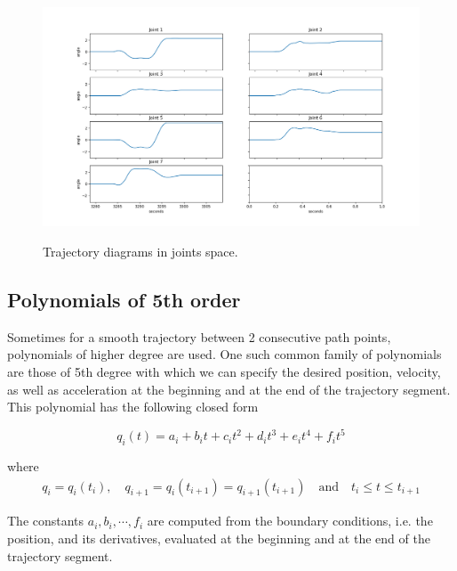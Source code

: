 \begin{center}
\begin{figure}[H]
\centering
\includegraphics[width=\textwidth]{images/trajectory1-test1.png}\\
\caption{Trajectory diagrams in joints space.}
\end{figure}
\end{center}


\subsection{Polynomials of 5th order}

Sometimes for a smooth trajectory between 2 consecutive path points, polynomials of higher degree are used. One such common family of polynomials are those of 5th degree with which we can specify the desired 
position, velocity, as well as acceleration at the beginning and at the end of the trajectory segment. This polynomial has the following closed form

\begin{equation}
q_i(t) = a_i + b_it + c_it^2 + d_it^3 + e_it^4 + f_it^5
\end{equation}

where
\begin{equation}
\begin{gathered}
q_i = q_i(t_i), \quad q_{i+1} = q_i(t_{i+1}) = q_{i+1}(t_{i+1}) \quad \textrm{and} \quad t_i \leq t \leq t_{i+1}
\end{gathered}
\end{equation}

The constants $a_i, b_i, \cdots, f_i$ are computed from the boundary conditions, i.e. the position, and its derivatives, evaluated at the beginning and at the end of the trajectory segment.

